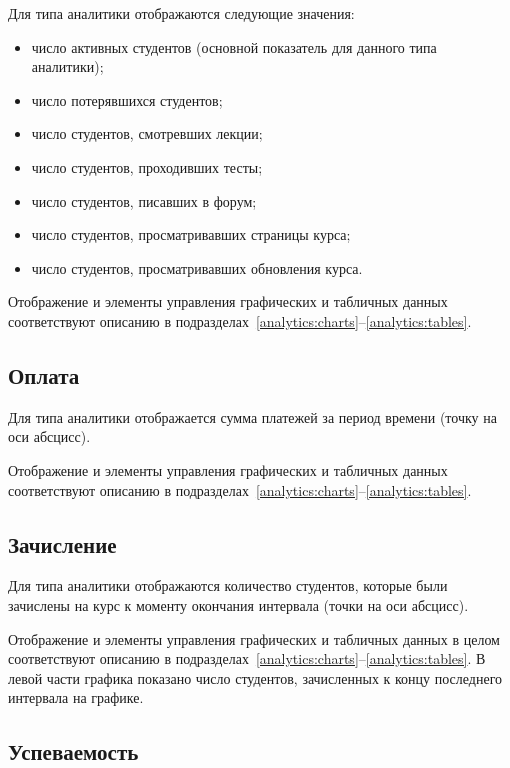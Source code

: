 Для типа аналитики  отображаются следующие значения:
\begin{itemize}
	\item число активных студентов (основной показатель для данного типа аналитики);
	\item число потерявшихся студентов;
	\item число студентов, смотревших лекции;
	\item число студентов, проходивших тесты;
	\item число студентов, писавших в форум;
	\item число студентов, просматривавших страницы курса;
	\item число студентов, просматривавших обновления курса.
\end{itemize}

Отображение и элементы управления графических и табличных данных соответствуют описанию в 
подразделах~\ref{analytics:charts}--\ref{analytics:tables}.

\subsection{Оплата}
\label{analytics:payments}
Для типа аналитики  отображается сумма платежей за период времени (точку на оси абсцисс).

Отображение и элементы управления графических и табличных данных соответствуют описанию в 
подразделах~\ref{analytics:charts}--\ref{analytics:tables}.

\subsection{Зачисление}
\label{analytics:enrollment}

Для типа аналитики  отображаются количество студентов, которые были зачислены на курс к 
моменту окончания интервала (точки на оси абсцисс).

Отображение и элементы управления графических и табличных данных в целом соответствуют описанию в 
подразделах~\ref{analytics:charts}--\ref{analytics:tables}. В левой части графика показано число
студентов, зачисленных к концу последнего интервала на графике.

\subsection{Успеваемость}
\label{analytics:progress}

